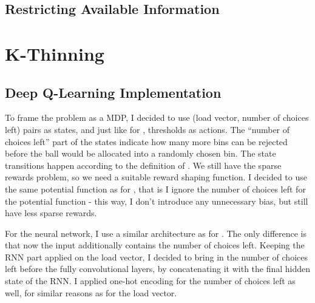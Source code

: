 
\subsection{Restricting Available Information} \label{lesssharedstate}







\section{K-Thinning}


\subsection{Deep Q-Learning Implementation}


To frame the \KThinning problem as a MDP, I decided to use (load vector, number of choices left) pairs as states, and just like for \TwoThinning, thresholds as actions. The ``number of choices left'' part of the states indicate how many more bins can be rejected before the ball would be allocated into a randomly chosen bin. The state transitions happen according to the definition of \KThinning {}. We still have the sparse rewards problem, so we need a suitable reward shaping function. I decided to use the same potential function as for \TwoThinning, that is I ignore the number of choices left for the potential function - this way, I don't introduce any unnecessary bias, but still have less sparse rewards. 


For the neural network, I use a similar architecture as for \TwoThinning. The only difference is that now the input additionally contains the number of choices left. Keeping the RNN part applied on the load vector, I decided to bring in the number of choices left before the fully convolutional layers, by concatenating it with the final hidden state of the RNN. I applied one-hot encoding for the number of choices left as well, for similar reasons as for the load vector.


